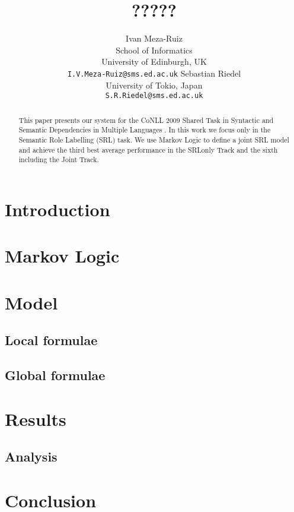 \documentclass[11pt]{article}
\title{?????}
\author{Ivan Meza-Ruiz \\
  School of Informatics\\
  University of Edinburgh, UK\\
  {\tt I.V.Meza-Ruiz@sms.ed.ac.uk} \And
  Sebastian Riedel\\
  University of Tokio, Japan\\
  {\tt S.R.Riedel@sms.ed.ac.uk}
  }
\date{}
\begin{document}
 


\maketitle
\begin{abstract}
This paper presents our system for the CoNLL 2009 Shared
Task in Syntactic and Semantic Dependencies in Multiple
Languages \citep{CoNLL-2009-ST}. In this work we focus only
in the Semantic Role Labelling (SRL) task. We use Markov Logic to define a joint SRL model and achieve
the third best average performance in the SRLonly Track and the sixth including
the Joint Track.
\end{abstract}

\section{Introduction}



\section{Markov Logic} \label{sec:markovlogic}



\section{Model} \label{sec:model} 


\subsection{Local formulae}\label{sec:local} 
 


\subsection{Global formulae}



\section{Results}\label{sec:results}



\subsection{Analysis}



\section{Conclusion} \label{sec:conclusion}





\end{document}
